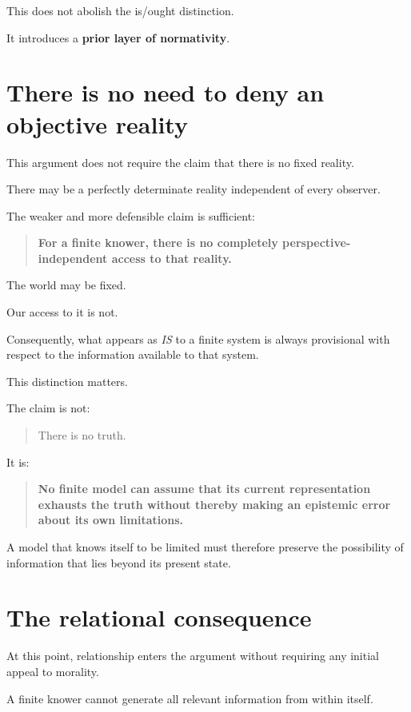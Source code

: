 \documentclass{article}
\begin{document}
This does not abolish the is/ought distinction.

It introduces a \textbf{prior layer of normativity}.

\section*{There is no need to deny an objective reality}

This argument does not require the claim that there is no fixed reality.

There may be a perfectly determinate reality independent of every observer.

The weaker and more defensible claim is sufficient:

\begin{quote}
    \textbf{For a finite knower, there is no completely perspective-independent access to that reality.}
\end{quote}

The world may be fixed.

Our access to it is not.

Consequently, what appears as \textit{IS} to a finite system is always provisional with respect to the information available to that system.

This distinction matters.

The claim is not:

\begin{quote}
    There is no truth.
\end{quote}

It is:

\begin{quote}
    \textbf{No finite model can assume that its current representation exhausts the truth without thereby making an epistemic error about its own limitations.}
\end{quote}

A model that knows itself to be limited must therefore preserve the possibility of information that lies beyond its present state.

\section*{The relational consequence}

At this point, relationship enters the argument without requiring any initial appeal to morality.

A finite knower cannot generate all relevant information from within itself.
\end{document}

